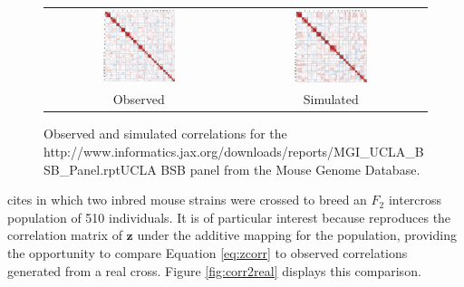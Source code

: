 \documentclass{article}
\newcommand{\href}[1]{#1} %
\newcommand{\ve}[1]{\mathbf{#1}}           %
\begin{document}
\begin{figure}[htp]
  \begin{center}
    \begin{tabular}{cc}
      \includegraphics[width = 0.400\textwidth]{./img/uclabsb.png} &
      \includegraphics[width = 0.400\textwidth]{./img/uclabsb_sim.png} \\
      {\footnotesize Observed} &
      {\footnotesize Simulated}
    \end{tabular}
  \end{center}
  \caption{Observed and simulated correlations for the \href{http://www.informatics.jax.org/downloads/reports/MGI_UCLA_BSB_Panel.rpt}{UCLA BSB panel} from the Mouse Genome Database.}
  \label{fig:uclabsb}
\end{figure}



\cite{cheverud2001} cites \cite{cheverudetal2001} in which two inbred mouse strains were crossed to breed an $F_2$ intercross population of 510 individuals. It is of particular interest because \cite{cheverud2001} reproduces the correlation matrix of $\ve{z}$ under the additive mapping for the population, providing the opportunity to compare Equation \ref{eq:zcorr} to observed correlations generated from a real cross. Figure \ref{fig:corr2real} displays this comparison.
\end{document}

